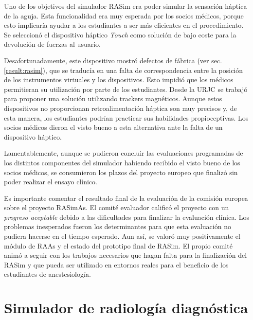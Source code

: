 Uno de los objetivos del simulador \ac{RASim} era poder simular la sensación háptica de la aguja. Esta funcionalidad era muy esperada por los socios médicos, porque esto implicaría ayudar a los estudiantes a ser más eficientes en el procedimiento. Se seleccionó el dispositivo háptico \emph{Touch} como solución de bajo coste para la devolución de fuerzas al usuario.  

Desafortunadamente, este dispositivo mostró defectos de fábrica (ver sec. \ref{result:rasim}), que se traducía en una falta de correspondencia entre la posición de los instrumentos virtuales y los dispositivos. Esto impidió que los médicos permitieran su utilización por parte de los estudiantes.  
%
Desde la \ac{URJC} se trabajó para proponer una solución utilizando \acs{tracker}s magnéticos. Aunque estos dispositivos no proporcionan retroalimentación háptica son muy precisos y, de esta manera, los estudiantes podrían practicar sus habilidades propioceptivas. Los socios médicos dieron el visto bueno a esta alternativa ante la falta de un dispositivo háptico. 

Lamentablemente, aunque se pudieron concluir las evaluaciones programadas de los distintos componentes del simulador habiendo recibido el visto bueno de los socios médicos, se consumieron los plazos del proyecto europeo que finalizó sin poder realizar el ensayo clínico.%


Es importante comentar el resultado final de la evaluación de la comisión europea sobre el proyecto \ac{RASimAs}. El comité evaluador calificó el proyecto con un \emph{progreso aceptable} debido a las dificultades para finalizar la evaluación clínica. Los problemas inesperados fueron los determinantes para que esta evaluación no pudiera hacerse en el tiempo esperado. Aun así, se valoró muy positivamente el módulo de \ac{RAAs} y el estado del prototipo final de \ac{RASim}. El propio comité animó a seguir con los trabajos necesarios que hagan falta para la finalización del \ac{RASim} y que pueda ser utilizado en entornos reales para el beneficio de los estudiantes de anestesiología.


\section{Simulador de radiología diagnóstica }
\label{conclu:xray}

